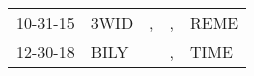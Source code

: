 \begin{supertabular}{p{0.07\textwidth}p{0.06\textwidth}p{0.02\textwidth}p{0.02\textwidth}p{0.06\textwidth}}
 10-31-15\textsuperscript{} &  3WID\textsuperscript{} &  , &  , &  REME\textsuperscript{} \\
 12-30-18\textsuperscript{} &  BILY\textsuperscript{} &    &  , &  TIME\textsuperscript{} \\
\end{supertabular}
